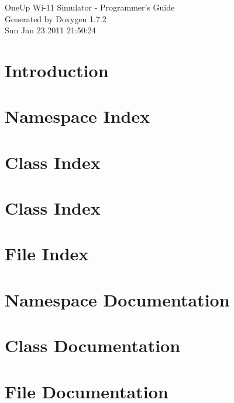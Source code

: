 \documentclass[letterpaper]{book}
\begin{document}
\hypersetup{pageanchor=false}
\begin{titlepage}
\vspace*{7cm}
\begin{center}
{\Large OneUp Wi-\/11 Simulator -\/ Programmer's Guide }\\
\vspace*{1cm}
{\large Generated by Doxygen 1.7.2}\\
\vspace*{0.5cm}
{\small Sun Jan 23 2011 21:50:24}\\
\end{center}
\end{titlepage}
\clearemptydoublepage
{}
\tableofcontents
\clearemptydoublepage
{}
\hypersetup{pageanchor=true}
\chapter{Introduction}
\label{index}\hypertarget{index}{}
\chapter{Namespace Index}

\chapter{Class Index}

\chapter{Class Index}

\chapter{File Index}

\chapter{Namespace Documentation}


\chapter{Class Documentation}


















\chapter{File Documentation}

















\printindex
\end{document}
